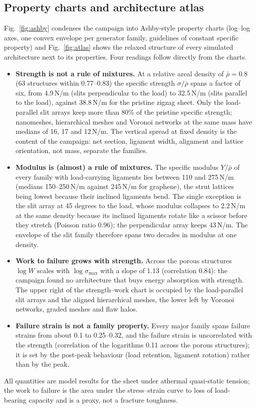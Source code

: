 \subsection{Property charts and architecture atlas}
\label{sec:ashby}
Fig.~\ref{fig:ashby} condenses the campaign into Ashby-style property charts (log--log axes, one convex envelope per generator family, guidelines of constant specific property) and Fig.~\ref{fig:atlas} shows the relaxed structure of every simulated architecture next to its properties. Four readings follow directly from the charts.
\begin{itemize}
\item \textbf{Strength is not a rule of mixtures.} At a relative areal density of $\bar\rho = 0.8$ (63 structures within 0.77--0.83) the specific strength $\sigma/\bar\rho$ spans a factor of six, from 4.9\,N/m (slits perpendicular to the load) to 32.5\,N/m (slits parallel to the load), against 38.8\,N/m for the pristine zigzag sheet. Only the load-parallel slit arrays keep more than 80\% of the pristine specific strength; nanomeshes, hierarchical meshes and Voronoi networks at the same mass have medians of 16, 17 and 12\,N/m. The vertical spread at fixed density is the content of the campaign: net section, ligament width, alignment and lattice orientation, not mass, separate the families.
\item \textbf{Modulus is (almost) a rule of mixtures.} The specific modulus $Y/\bar\rho$ of every family with load-carrying ligaments lies between 110 and 275\,N/m (medians 150--250\,N/m against 245\,N/m for graphene), the strut lattices being lowest because their inclined ligaments bend. The single exception is the slit array at 45 degrees to the load, whose modulus collapses to 2.2\,N/m at the same density because its inclined ligaments rotate like a scissor before they stretch (Poisson ratio 0.96); the perpendicular array keeps 43\,N/m. The envelope of the slit family therefore spans two decades in modulus at one density.
\item \textbf{Work to failure grows with strength.} Across the porous structures $\log W$ scales with $\log\sigma_\mathrm{max}$ with a slope of 1.13 (correlation 0.84): the campaign found no architecture that buys energy absorption with strength. The upper right of the strength--work chart is occupied by the load-parallel slit arrays and the aligned hierarchical meshes, the lower left by Voronoi networks, graded meshes and flaw halos.
\item \textbf{Failure strain is not a family property.} Every major family spans failure strains from about 0.1 to 0.25--0.32, and the failure strain is uncorrelated with the strength (correlation of the logarithms 0.11 across the porous structures); it is set by the post-peak behaviour (load retention, ligament rotation) rather than by the peak.
\end{itemize}
All quantities are model results for the \rebo{} sheet under athermal quasi-static tension; the work to failure is the area under the stress--strain curve to loss of load-bearing capacity and is a proxy, not a fracture toughness.

